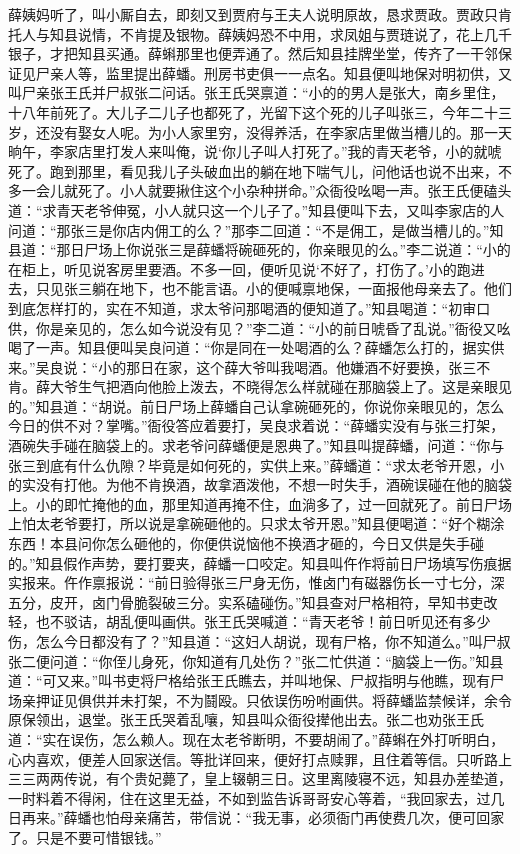 \begin{parag}
    薛姨妈听了，叫小厮自去，即刻又到贾府与王夫人说明原故，恳求贾政。贾政只肯托人与知县说情，不肯提及银物。薛姨妈恐不中用，求凤姐与贾琏说了，花上几千银子，才把知县买通。薛蝌那里也便弄通了。然后知县挂牌坐堂，传齐了一干邻保证见尸亲人等，监里提出薛蟠。刑房书吏俱一一点名。知县便叫地保对明初供，又叫尸亲张王氏并尸叔张二问话。张王氏哭禀道：“小的的男人是张大，南乡里住，十八年前死了。大儿子二儿子也都死了，光留下这个死的儿子叫张三，今年二十三岁，还没有娶女人呢。为小人家里穷，没得养活，在李家店里做当槽儿的。那一天晌午，李家店里打发人来叫俺，说‘你儿子叫人打死了。”我的青天老爷，小的就唬死了。跑到那里，看见我儿子头破血出的躺在地下喘气儿，问他话也说不出来，不多一会儿就死了。小人就要揪住这个小杂种拼命。”众衙役吆喝一声。张王氏便磕头道：“求青天老爷伸冤，小人就只这一个儿子了。”知县便叫下去，又叫李家店的人问道：“那张三是你店内佣工的么？”那李二回道：“不是佣工，是做当槽儿的。”知县道：“那日尸场上你说张三是薛蟠将碗砸死的，你亲眼见的么。”李二说道：“小的在柜上，听见说客房里要酒。不多一回，便听见说‘不好了，打伤了。’小的跑进去，只见张三躺在地下，也不能言语。小的便喊禀地保，一面报他母亲去了。他们到底怎样打的，实在不知道，求太爷问那喝酒的便知道了。”知县喝道：“初审口供，你是亲见的，怎么如今说没有见？”李二道：“小的前日唬昏了乱说。”衙役又吆喝了一声。知县便叫吴良问道：“你是同在一处喝酒的么？薛蟠怎么打的，据实供来。”吴良说：“小的那日在家，这个薛大爷叫我喝酒。他嫌酒不好要换，张三不肯。薛大爷生气把酒向他脸上泼去，不晓得怎么样就碰在那脑袋上了。这是亲眼见的。”知县道：“胡说。前日尸场上薛蟠自己认拿碗砸死的，你说你亲眼见的，怎么今日的供不对？掌嘴。”衙役答应着要打，吴良求着说：“薛蟠实没有与张三打架，酒碗失手碰在脑袋上的。求老爷问薛蟠便是恩典了。”知县叫提薛蟠，问道：“你与张三到底有什么仇隙？毕竟是如何死的，实供上来。”薛蟠道：“求太老爷开恩，小的实没有打他。为他不肯换酒，故拿酒泼他，不想一时失手，酒碗误碰在他的脑袋上。小的即忙掩他的血，那里知道再掩不住，血淌多了，过一回就死了。前日尸场上怕太老爷要打，所以说是拿碗砸他的。只求太爷开恩。”知县便喝道：“好个糊涂东西！本县问你怎么砸他的，你便供说恼他不换酒才砸的，今日又供是失手碰的。”知县假作声势，要打要夹，薛蟠一口咬定。知县叫仵作将前日尸场填写伤痕据实报来。仵作禀报说：“前日验得张三尸身无伤，惟卤门有磁器伤长一寸七分，深五分，皮开，卤门骨脆裂破三分。实系磕碰伤。”知县查对尸格相符，早知书吏改轻，也不驳诘，胡乱便叫画供。张王氏哭喊道：“青天老爷！前日听见还有多少伤，怎么今日都没有了？”知县道：“这妇人胡说，现有尸格，你不知道么。”叫尸叔张二便问道：“你侄儿身死，你知道有几处伤？”张二忙供道：“脑袋上一伤。”知县道：“可又来。”叫书吏将尸格给张王氏瞧去，并叫地保、尸叔指明与他瞧，现有尸场亲押证见俱供并未打架，不为鬪殴。只依误伤吩咐画供。将薛蟠监禁候详，余令原保领出，退堂。张王氏哭着乱嚷，知县叫众衙役撵他出去。张二也劝张王氏道：“实在误伤，怎么赖人。现在太老爷断明，不要胡闹了。”薛蝌在外打听明白，心内喜欢，便差人回家送信。等批详回来，便好打点赎罪，且住着等信。只听路上三三两两传说，有个贵妃薨了，皇上辍朝三日。这里离陵寝不远，知县办差垫道，一时料着不得闲，住在这里无益，不如到监告诉哥哥安心等着，“我回家去，过几日再来。”薛蟠也怕母亲痛苦，带信说：“我无事，必须衙门再使费几次，便可回家了。只是不要可惜银钱。”
\end{parag}


